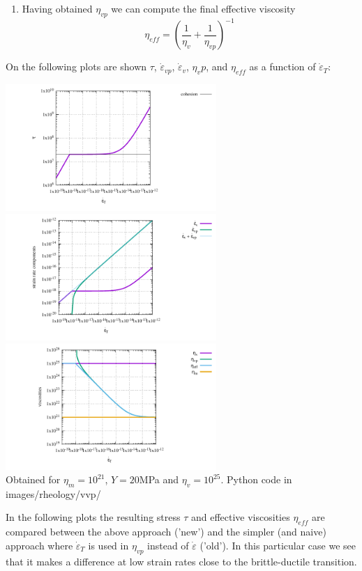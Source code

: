 \begin{itemize}
\begin{enumerate}
\item Having obtained $\eta_{vp}$ we can compute the final effective viscosity
\[
\eta_{eff} = \left( \frac{1}{\eta_v}  + \frac{1}{\eta_{vp}}  \right)^{-1}
\]
\end{enumerate}

On the following plots are shown $\tau$, 
$\dot\varepsilon_{vp}$, $\dot\varepsilon_v$, $\eta_vp$, and $\eta_{eff}$ 
as a function of  $\dot\varepsilon_T$: 

\begin{center}
\includegraphics[width=8cm]{images/rheology/vvp/tau.pdf}\\
\includegraphics[width=8cm]{images/rheology/vvp/strainrates.pdf}\\
\includegraphics[width=8cm]{images/rheology/vvp/viscosities.pdf}\\
{\captionfont Obtained for $\eta_m=10^{21}$, $Y=20$MPa and $\eta_v=10^{25}$. Python code 
in images/rheology/vvp/}
\end{center}

In the following plots the resulting stress $\tau$ and effective viscosities $\eta_{eff}$
are compared between the above approach ('new') and the simpler (and naive) 
approach where $\dot\varepsilon_T$ 
is used in $\eta_{vp}$ instead of $\dot\varepsilon$ ('old'). In this particular case 
we see that it makes a difference at low strain rates close to the brittle-ductile transition.


\end{itemize}
